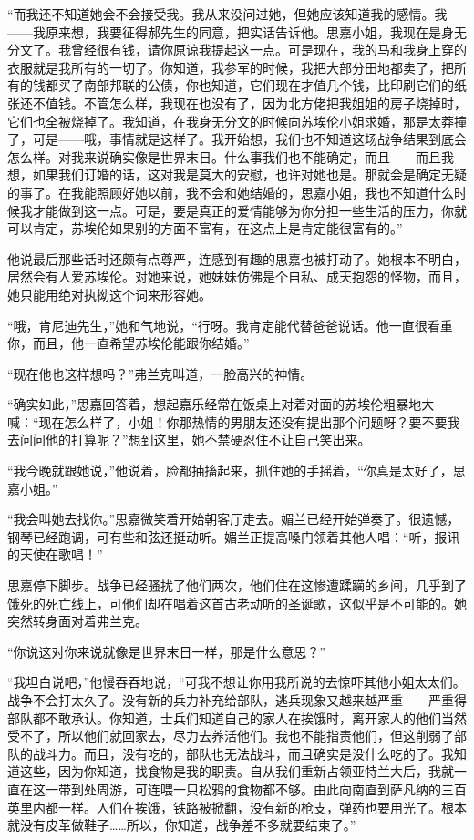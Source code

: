 \par “而我还不知道她会不会接受我。我从来没问过她，但她应该知道我的感情。我——我原来想，我要征得郝先生的同意，把实话告诉他。思嘉小姐，我现在是身无分文了。我曾经很有钱，请你原谅我提起这一点。可是现在，我的马和我身上穿的衣服就是我所有的一切了。你知道，我参军的时候，我把大部分田地都卖了，把所有的钱都买了南部邦联的公债，你也知道，它们现在才值几个钱，比印刷它们的纸张还不值钱。不管怎么样，我现在也没有了，因为北方佬把我姐姐的房子烧掉时，它们也全被烧掉了。我知道，在我身无分文的时候向苏埃伦小姐求婚，那是太莽撞了，可是——哦，事情就是这样了。我开始想，我们也不知道这场战争结果到底会怎么样。对我来说确实像是世界末日。什么事我们也不能确定，而且——而且我想，如果我们订婚的话，这对我是莫大的安慰，也许对她也是。那就会是确定无疑的事了。在我能照顾好她以前，我不会和她结婚的，思嘉小姐，我也不知道什么时候我才能做到这一点。可是，要是真正的爱情能够为你分担一些生活的压力，你就可以肯定，苏埃伦如果别的方面不富有，在这点上是肯定能很富有的。”
\par 他说最后那些话时还颇有点尊严，连感到有趣的思嘉也被打动了。她根本不明白，居然会有人爱苏埃伦。对她来说，她妹妹仿佛是个自私、成天抱怨的怪物，而且，她只能用绝对执拗这个词来形容她。
\par “哦，肯尼迪先生，”她和气地说，“行呀。我肯定能代替爸爸说话。他一直很看重你，而且，他一直希望苏埃伦能跟你结婚。”
\par “现在他也这样想吗？”弗兰克叫道，一脸高兴的神情。
\par “确实如此，”思嘉回答着，想起嘉乐经常在饭桌上对着对面的苏埃伦粗暴地大喊：“现在怎么样了，小姐！你那热情的男朋友还没有提出那个问题呀？要不要我去问问他的打算呢？”想到这里，她不禁硬忍住不让自己笑出来。
\par “我今晚就跟她说，”他说着，脸都抽搐起来，抓住她的手摇着，“你真是太好了，思嘉小姐。”
\par “我会叫她去找你。”思嘉微笑着开始朝客厅走去。媚兰已经开始弹奏了。很遗憾，钢琴已经跑调，可有些和弦还挺动听。媚兰正提高嗓门领着其他人唱：“听，报讯的天使在歌唱！”
\par 思嘉停下脚步。战争已经骚扰了他们两次，他们住在这惨遭蹂躏的乡间，几乎到了饿死的死亡线上，可他们却在唱着这首古老动听的圣诞歌，这似乎是不可能的。她突然转身面对着弗兰克。
\par “你说这对你来说就像是世界末日一样，那是什么意思？”
\par “我坦白说吧，”他慢吞吞地说，“可我不想让你用我所说的去惊吓其他小姐太太们。战争不会打太久了。没有新的兵力补充给部队，逃兵现象又越来越严重——严重得部队都不敢承认。你知道，士兵们知道自己的家人在挨饿时，离开家人的他们当然受不了，所以他们就回家去，尽力去养活他们。我也不能指责他们，但这削弱了部队的战斗力。而且，没有吃的，部队也无法战斗，而且确实是没什么吃的了。我知道这些，因为你知道，找食物是我的职责。自从我们重新占领亚特兰大后，我就一直在这一带到处周游，可连喂一只松鸦的食物都不够。由此向南直到萨凡纳的三百英里内都一样。人们在挨饿，铁路被掀翻，没有新的枪支，弹药也要用光了。根本就没有皮革做鞋子……所以，你知道，战争差不多就要结束了。”
